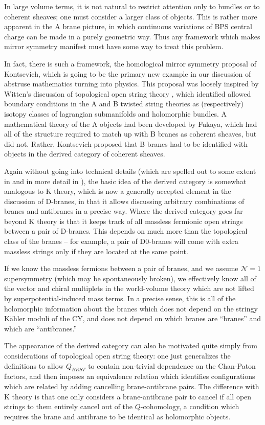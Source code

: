 \documentclass[a4paper,12pt]{amsart}
\numberwithin{equation}{section}
\theoremstyle{plain}
\theoremstyle{definition}
\def\cal{\mathcal}
\def\CN{{\cal N}}
\begin{document}
In large volume terms, it is not natural to restrict attention only to
bundles or to coherent sheaves; one must consider a larger class of
objects.  This is rather more apparent in the A brane picture, in
which continuous variations of BPS central charge can be made in a
purely geometric way.  Thus any framework which makes mirror symmetry
manifest must have some way to treat this problem.

In fact, there is such a framework, the homological mirror symmetry
proposal of Kontsevich, which is going to be the primary new example
in our discussion of abstruse mathematics turning into physics.  This
proposal was loosely inspired by Witten's discussion of topological
open string theory \cite{Witten-top}, which identified allowed
boundary conditions in the A and B twisted string theories as
(respectively) isotopy classes of lagrangian submanifolds and
holomorphic bundles.  A mathematical theory of the A objects had been
developed by Fukaya, which had all of the structure required to match
up with B branes as coherent sheaves, but did not.  Rather, Kontsevich
proposed that B branes had to be identified with objects in the
derived category of coherent sheaves.

Again without going into technical details (which are
spelled out to some extent in \cite{DCS} and in more detail in
\cite{AspLaw,Diac}), the basic idea of the derived category is
somewhat analogous to K theory, which is now a generally accepted
element in the discussion of D-branes, in that it allows discussing
arbitrary combinations of branes and antibranes in a precise way.
Where the derived category goes far beyond K theory is that it keeps
track of all massless fermionic open strings between a pair of
D-branes.  This depends on much more than the topological class of the
branes -- for example, a pair of D$0$-branes will come with extra
massless strings only if they are located at the same point.

If we know the massless fermions between a pair of branes, and we
assume $\CN=1$ supersymmetry (which may be spontaneously broken), we
effectively know all of the vector and chiral multiplets in the
world-volume theory which are not lifted by superpotential-induced
mass terms.  In a precise sense, this is all of the holomorphic
information about the branes which does not depend on the stringy
K\"ahler moduli of the CY, and does not depend on which branes are
``branes'' and which are ``antibranes.''  

The appearance of the derived category can also be motivated quite
simply from considerations of topological open string theory: one just
generalizes the definitions to allow $Q_{BRST}$ to contain non-trivial
dependence on the Chan-Paton factors, and then imposes an equivalence
relation which identifies configurations which are related by adding
cancelling brane-antibrane pairs.  The difference with K theory is
that one only considers a brane-antibrane pair to cancel if all open
strings to them entirely cancel out of the $Q$-cohomology, a condition
which requires the brane and antibrane to be identical as holomorphic
objects.  
\end{document}
